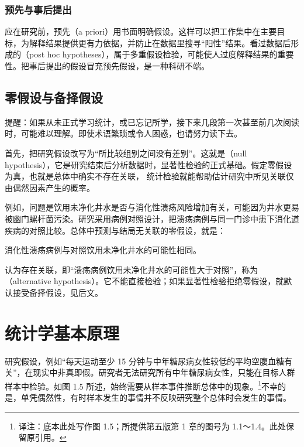 \subsubsection{预先与事后提出}
应在研究前，预先（a priori）用书面明确假设。这样可以把工作集中在主要目标，为解释结果提供更有力依据，并防止在数据里搜寻“阳性”结果。看过数据后形成的（post hoc hypotheses），属于多重假设检验，可能使人过度解释结果的重要性。把事后提出的假设冒充预先假设，是一种科研不端。

\subsection{零假设与备择假设}
提醒：如果从未正式学习统计，或已忘记所学，接下来几段第一次甚至前几次阅读时，可能难以理解。即使术语繁琐或令人困惑，也请努力读下去。

首先，把研究假设改写为“所比较组别之间没有差别”。这就是（null hypothesis），它是研究结束后分析数据时，显著性检验的正式基础。假定零假设为真，也就是总体中确实不存在关联，
统计检验就能帮助估计研究中所见关联仅由偶然因素产生的概率。

例如，问题是饮用未净化井水是否与消化性溃疡风险增加有关，可能因为井水更易被幽门螺杆菌污染。研究采用病例对照设计，把溃疡病例与同一门诊中患下消化道疾病的对照比较。总体中预测与结局无关联的零假设，就是：
\begin{studyquote}消化性溃疡病例与对照饮用未净化井水的可能性相同。\end{studyquote}
认为存在关联，即“溃疡病例饮用未净化井水的可能性大于对照”，称为（alternative hypothesis）。它不能直接检验；如果显著性检验拒绝零假设，就默认接受备择假设，见后文。

\section{统计学基本原理}
研究假设，例如“每天运动至少 15 分钟与中年糖尿病女性较低的平均空腹血糖有关”，在现实中非真即假。研究者无法研究所有中年糖尿病女性，只能在目标人群样本中检验。如图 1.5 所述，始终需要从样本事件推断总体中的现象。\footnote{译注：底本此处写作图 1.5；所提供第五版第 1 章的图号为 1.1～1.4。此处保留原引用。}不幸的是，单凭偶然性，有时样本发生的事情并不反映研究整个总体时会发生的事情。

